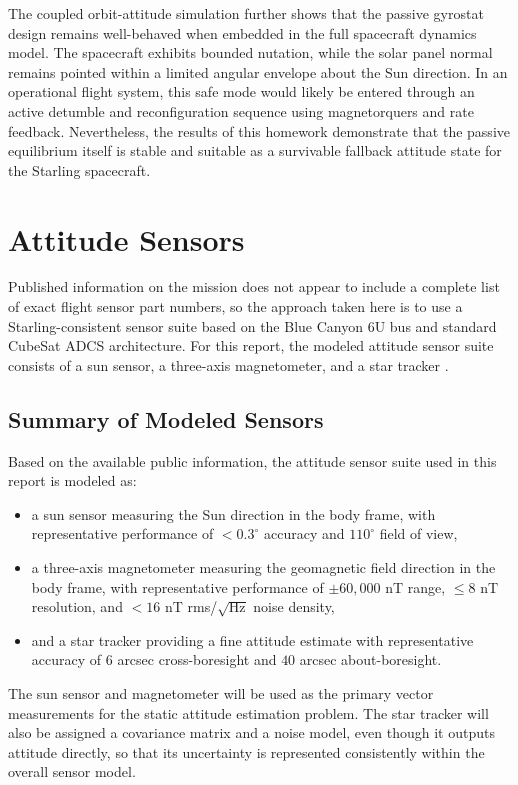 \documentclass[12pt]{article}
\begin{document}
The coupled orbit-attitude simulation further shows that the passive gyrostat design
remains well-behaved when embedded in the full spacecraft dynamics model. The
spacecraft exhibits bounded nutation, while the solar panel normal remains pointed
within a limited angular envelope about the Sun direction. In an operational flight
system, this safe mode would likely be entered through an active detumble and
reconfiguration sequence using magnetorquers and rate feedback. Nevertheless, the
results of this homework demonstrate that the passive equilibrium itself is stable
and suitable as a survivable fallback attitude state for the Starling spacecraft.

\section{Attitude Sensors}

Published information on the mission does not appear to include a complete list of exact flight sensor part numbers, so the approach taken here is to use a Starling-consistent sensor suite based on the Blue Canyon 6U bus and standard CubeSat ADCS architecture. For this report, the modeled attitude sensor suite consists of a sun sensor, a three-axis magnetometer, and a star tracker \cite{STARLING_OVERVIEW,BCT_XB1,BCT_XACT}.

\subsection{Summary of Modeled Sensors}

Based on the available public information, the attitude sensor suite used in this report is modeled as:
\begin{itemize}
    \item a sun sensor measuring the Sun direction in the body frame, with representative performance of \(<0.3^\circ\) accuracy and \(110^\circ\) field of view,
    \item a three-axis magnetometer measuring the geomagnetic field direction in the body frame, with representative performance of \(\pm 60{,}000\) nT range, \(\leq 8\) nT resolution, and \(<16\) nT rms/\(\sqrt{\text{Hz}}\) noise density,
    \item and a star tracker providing a fine attitude estimate with representative accuracy of \(6\) arcsec cross-boresight and \(40\) arcsec about-boresight.
\end{itemize}

The sun sensor and magnetometer will be used as the primary vector measurements for the static attitude estimation problem. The star tracker will also be assigned a covariance matrix and a noise model, even though it outputs attitude directly, so that its uncertainty is represented consistently within the overall sensor model.
\end{document}
